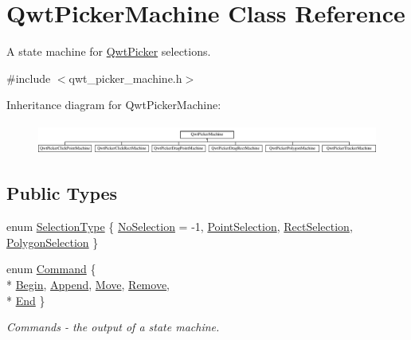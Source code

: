 \hypertarget{class_qwt_picker_machine}{\section{Qwt\-Picker\-Machine Class Reference}
\label{class_qwt_picker_machine}
}


A state machine for \hyperlink{class_qwt_picker}{Qwt\-Picker} selections.  




{\ttfamily \#include $<$qwt\-\_\-picker\-\_\-machine.\-h$>$}

Inheritance diagram for Qwt\-Picker\-Machine\-:\begin{figure}[H]
\begin{center}
\leavevmode
\includegraphics[height=1.020036cm]{class_qwt_picker_machine}
\end{center}
\end{figure}
\subsection*{Public Types}
\begin{DoxyCompactItemize}
\item 
enum \hyperlink{class_qwt_picker_machine_a24a9faf12cfa5746eee839a2c0bb937d}{Selection\-Type} \{ \hyperlink{class_qwt_picker_machine_a24a9faf12cfa5746eee839a2c0bb937da326bcc03f7a99aa5970d875f3db46888}{No\-Selection} = -\/1, 
\hyperlink{class_qwt_picker_machine_a24a9faf12cfa5746eee839a2c0bb937dae65a34cc1ca5d818eb65c05b2484d855}{Point\-Selection}, 
\hyperlink{class_qwt_picker_machine_a24a9faf12cfa5746eee839a2c0bb937da9f540e78958e8e238240584120e8af1d}{Rect\-Selection}, 
\hyperlink{class_qwt_picker_machine_a24a9faf12cfa5746eee839a2c0bb937dac74671ee5ba5d6fd0410f71db1aa3b97}{Polygon\-Selection}
 \}
\item 
enum \hyperlink{class_qwt_picker_machine_a3a8d3d4c107ce5f8351e4cbdd38c43f7}{Command} \{ \\*
\hyperlink{class_qwt_picker_machine_a3a8d3d4c107ce5f8351e4cbdd38c43f7a6e3829557df2ff8b14aac8c49e258b36}{Begin}, 
\hyperlink{class_qwt_picker_machine_a3a8d3d4c107ce5f8351e4cbdd38c43f7a91c908456ecce1baaa9fc05ef62f3954}{Append}, 
\hyperlink{class_qwt_picker_machine_a3a8d3d4c107ce5f8351e4cbdd38c43f7a9769cf1b393cce8c3307a627521249e6}{Move}, 
\hyperlink{class_qwt_picker_machine_a3a8d3d4c107ce5f8351e4cbdd38c43f7a1beef796002aa73402eda882fe540a74}{Remove}, 
\\*
\hyperlink{class_qwt_picker_machine_a3a8d3d4c107ce5f8351e4cbdd38c43f7a76409513374e4e89a2070ebe4f4a9761}{End}
 \}
\begin{DoxyCompactList}\small\item\em Commands -\/ the output of a state machine. \end{DoxyCompactList}\end{DoxyCompactItemize}
